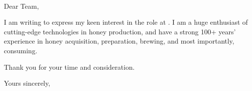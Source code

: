 \documentclass{letter}
\begin{document}
\date{\today}

\begin{letter}{\recipient \\ \recipientAddress}

\opening{Dear \recipient{} Team,}

I am writing to express my keen interest in the \textbf{\positionName{}} role at \positionCompany{}.
I am a huge enthusiast of cutting-edge technologies in honey production, and have a strong 100+ years' experience in honey acquisition, preparation, brewing, and most importantly, consuming.

\lipsum[2-4] %

Thank you for your time and consideration.

\vspace{4pt}

Yours sincerely,

\bioName

\end{letter}
\end{document}
